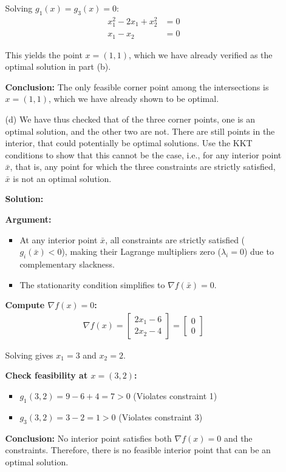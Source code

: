 \documentclass{article}
\begin{document}
\begin{enumerate}
\begin{enumerate}
    Solving $g_1(x) = g_3(x) = 0$:
    \begin{align*}
    x_1^2 - 2x_1 + x_2^2 &= 0 \\
    x_1 - x_2 &= 0
    \end{align*}
    
    This yields the point $x = (1, 1)$, which we have already verified as the optimal solution in part (b).
    
    \textbf{Conclusion:} The only feasible corner point among the intersections is $x = (1, 1)$, which we have already shown to be optimal.
    
    \item[(d)] We have thus checked that of the three corner points, one is an optimal solution, and the other two are not. There are still points in the interior, that could potentially be optimal solutions. Use the KKT conditions to show that this cannot be the case, i.e., for any interior point $\bar{x}$, that is, any point for which the three constraints are strictly satisfied, $\bar{x}$ is not an optimal solution.
    
    \textbf{Solution:}
    
    \textbf{Argument:}
    \begin{itemize}
    \item At any interior point $\bar{x}$, all constraints are strictly satisfied ($g_i(\bar{x}) < 0$), making their Lagrange multipliers zero ($\lambda_i = 0$) due to complementary slackness.
    \item The stationarity condition simplifies to $\nabla f(\bar{x}) = 0$.
    \end{itemize}
    
    \textbf{Compute $\nabla f(x) = 0$:}
    \begin{align*}
    \nabla f(x) = \begin{bmatrix} 2x_1 - 6 \\ 2x_2 - 4 \end{bmatrix} = \begin{bmatrix} 0 \\ 0 \end{bmatrix}
    \end{align*}
    
    Solving gives $x_1 = 3$ and $x_2 = 2$.
    
    \textbf{Check feasibility at $x = (3, 2)$:}
    \begin{itemize}
    \item $g_1(3, 2) = 9 - 6 + 4 = 7 > 0$ (Violates constraint 1)
    \item $g_3(3, 2) = 3 - 2 = 1 > 0$ (Violates constraint 3)
    \end{itemize}
    
    \textbf{Conclusion:} No interior point satisfies both $\nabla f(x) = 0$ and the constraints. Therefore, there is no feasible interior point that can be an optimal solution.
    
    \end{enumerate}
\end{enumerate}
\end{document}
